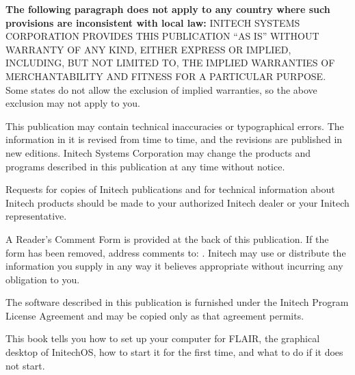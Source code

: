 \begin{TitleVerso}
\IsThisGoodForTheCompany
{\imLegalFont
\textbf{The following paragraph does not apply to any country where such
provisions are inconsistent with local law:} INITECH SYSTEMS CORPORATION
PROVIDES THIS PUBLICATION ``AS IS'' WITHOUT WARRANTY OF ANY KIND, EITHER
EXPRESS OR IMPLIED, INCLUDING, BUT NOT LIMITED TO, THE IMPLIED WARRANTIES OF
MERCHANTABILITY AND FITNESS FOR A PARTICULAR PURPOSE.  Some states do not
allow the exclusion of implied warranties, so the above exclusion may not
apply to you.\par
This publication may contain technical inaccuracies or typographical errors.
The information in it is revised from time to time, and the revisions are
published in new editions.  Initech Systems Corporation may change the
products and programs described in this publication at any time without
notice.\par
Requests for copies of Initech publications and for technical information
about Initech products should be made to your authorized Initech dealer or
your Initech representative.\par}

{\footnotesize
A Reader's Comment Form is provided at the back of this publication.  If the
form has been removed, address comments to: \InitechAddressLine.
Initech may use or distribute the information you supply in any way it
believes appropriate without incurring any obligation to you.\par
The software described in this publication is furnished under the Initech
Program License Agreement and may be copied only as that agreement
permits.\par}
\end{TitleVerso}

This book tells you how to set up your computer for FLAIR\tm{}, the
graphical desktop of InitechOS\tm{}, how to start it for the first time, and
what to do if it does not start.

